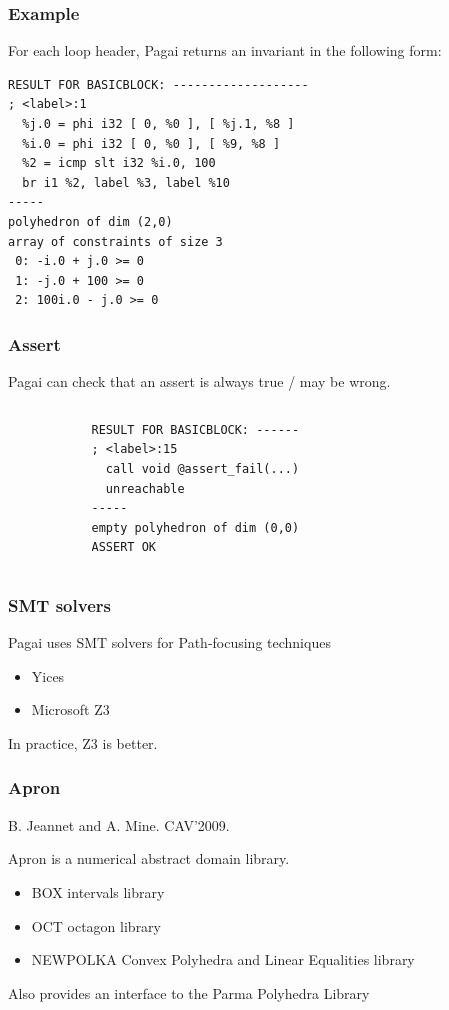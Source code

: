 \documentclass{beamer}
\begin{document}
\begin{frame}[containsverbatim]
	\frametitle{Example}
For each loop header, Pagai returns an invariant in the following form:
	\begin{verbatim}
RESULT FOR BASICBLOCK: -------------------
; <label>:1 
  %j.0 = phi i32 [ 0, %0 ], [ %j.1, %8 ]
  %i.0 = phi i32 [ 0, %0 ], [ %9, %8 ]
  %2 = icmp slt i32 %i.0, 100
  br i1 %2, label %3, label %10
-----
polyhedron of dim (2,0)
array of constraints of size 3
 0: -i.0 + j.0 >= 0
 1: -j.0 + 100 >= 0
 2: 100i.0 - j.0 >= 0
\end{verbatim}
\end{frame}

\begin{frame}[containsverbatim]
	\frametitle{Assert}
Pagai can check that an assert is always true / may be wrong.
\begin{columns}
	
\begin{column}{1cm}
\end{column}
\begin{column}{10cm}
\begin{verbatim}
RESULT FOR BASICBLOCK: ------
; <label>:15                                      
  call void @assert_fail(...) 
  unreachable
-----
empty polyhedron of dim (0,0)
ASSERT OK
\end{verbatim}
\end{column}
\end{columns}
\end{frame}

\begin{frame}
	\frametitle{SMT solvers}
	Pagai uses SMT solvers for Path-focusing techniques

	\begin{itemize}
		\item Yices
		\item Microsoft Z3
	\end{itemize}

	In practice, Z3 is better.
\end{frame}

\begin{frame}
	\frametitle{Apron}
B. Jeannet and A. Mine. CAV'2009. 

\vspace{1cm}

Apron is a numerical abstract domain library.

\begin{itemize}
	\item BOX intervals library
	\item OCT octagon library
	\item NEWPOLKA Convex Polyhedra and Linear Equalities library 
\end{itemize}
Also provides an interface to the Parma Polyhedra Library
\end{frame}
\end{document}
